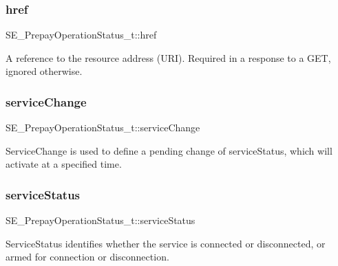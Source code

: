 \subsubsection{\texorpdfstring{href}{href}}
{\footnotesize\ttfamily S\+E\+\_\+\+Prepay\+Operation\+Status\+\_\+t\+::href}

A reference to the resource address (U\+RI). Required in a response to a G\+ET, ignored otherwise. \mbox{\label{group__PrepayOperationStatus_ga3934e843a26a66a371d3fc0e867d8238}} 
\subsubsection{\texorpdfstring{service\+Change}{serviceChange}}
{\footnotesize\ttfamily S\+E\+\_\+\+Prepay\+Operation\+Status\+\_\+t\+::service\+Change}

Service\+Change is used to define a pending change of service\+Status, which will activate at a specified time. \mbox{\label{group__PrepayOperationStatus_ga14485626368fa2177e115ed7117f2338}} 
\subsubsection{\texorpdfstring{service\+Status}{serviceStatus}}
{\footnotesize\ttfamily S\+E\+\_\+\+Prepay\+Operation\+Status\+\_\+t\+::service\+Status}

Service\+Status identifies whether the service is connected or disconnected, or armed for connection or disconnection. 